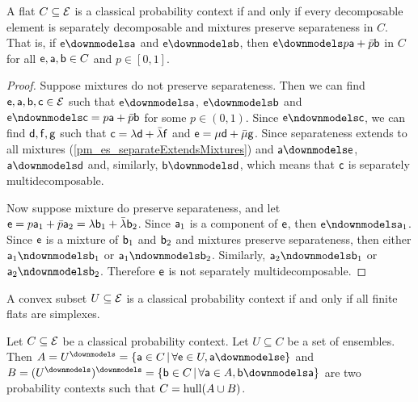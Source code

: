 \begin{mathSection}
\begin{prop}
	A flat $C \subseteq \Ens$ is a classical probability context if and only if every decomposable element is separately decomposable and mixtures preserve separateness in $C$. That is, if $\ens \separate \ens[a]$ and $\ens \separate \ens[b]$, then $\ens \separate p\ens[a] + \bar{p} \ens[b]$ in $C$ for all $\ens, \ens[a], \ens[b] \in C$ and $p \in [0,1]$.
\end{prop}

\begin{proof}
	Suppose mixtures do not preserve separateness. Then we can find $\ens,\ens[a],\ens[b], \ens[c] \in \Ens$ such that $\ens \separate \ens[a]$, $\ens \separate \ens[b]$ and $\ens \nseparate \ens[c] = p \ens[a] + \bar{p} \ens[b]$ for some $p \in (0,1)$. Since $\ens \nseparate \ens[c]$, we can find $\ens[d], \ens[f], \ens[g]$ such that $\ens[c] = \lambda \ens[d] + \bar{\lambda} \ens[f]$ and $\ens = \mu \ens[d] + \bar{\mu} \ens[g]$.  Since separateness extends to all mixtures (\ref{pm_es_separateExtendsMixtures}) and $\ens[a] \separate \ens[e]$, $\ens[a] \separate \ens[d]$ and, similarly, $\ens[b] \separate \ens[d]$, which means that $\ens[c]$ is separately multidecomposable.
	
	Now suppose mixture do preserve separateness, and let $\ens = p \ens[a]_1 + \bar{p} \ens[a]_2 = \lambda \ens[b]_1 +\bar{\lambda} \ens[b]_2$. Since $\ens[a]_1$ is a component of $\ens$, then $\ens \nseparate \ens[a]_1$. Since $\ens$ is a mixture of $\ens[b]_1$ and $\ens[b]_2$ and mixtures preserve separateness, then either $\ens[a]_1 \nseparate \ens[b]_1$ or $\ens[a]_1 \nseparate \ens[b]_2$. Similarly, $\ens[a]_2 \nseparate \ens[b]_1$ or $\ens[a]_2 \nseparate \ens[b]_2$. Therefore $\ens$ is not separately multidecomposable.
\end{proof}

\begin{conj}
	A convex subset $U \subseteq \Ens$ is a classical probability context if and only if all finite flats are simplexes.
\end{conj}

\begin{prop}
	Let $C \subseteq \Ens$ be a classical probability context. Let $U \subseteq C$ be a set of ensembles. Then $A=U^\separate=\{ \ens[a] \in C \, | \, \forall \ens \in U, \ens[a] \separate \ens \}$ and $B=(U^\separate)^\separate=\{ \ens[b] \in C \, | \, \forall \ens[a] \in A, \ens[b] \separate \ens[a] \}$ are two probability contexts such that $C = \hull(A \cup B)$.
\end{prop}


\end{mathSection}

